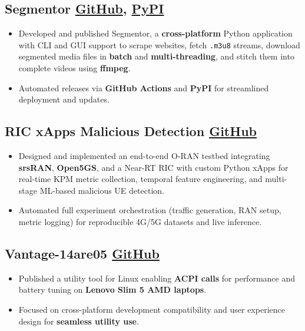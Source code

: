 \documentclass[10pt]{article}
\newcommand{\rside}[1]{
  \hfill {\small\color{accent} #1}%
}
\begin{document}
\subsection{Segmentor \rside{\href{https://github.com/ayushjaipuriyar/animepahe-dl}{GitHub}, \href{https://pypi.org/project/animepahe-dl/}{PyPI}}}
\begin{itemize}
  \item Developed and published {Segmentor}, a \textbf{cross-platform} Python application with CLI and GUI support to scrape websites, fetch \texttt{.m3u8} streams, download segmented media files in \textbf{batch} and \textbf{multi-threading}, and stitch them into complete videos using \textbf{ffmpeg}.
  \item Automated releases via \textbf{GitHub Actions} and \textbf{PyPI} for streamlined deployment and updates.
\end{itemize}
\subsection{RIC xApps Malicious Detection \rside{\href{https://github.com/ayushjaipuriyar/ric-xapps-malicious-detection/}{GitHub}}}
\begin{itemize}
  \item Designed and implemented an end-to-end O-RAN testbed integrating \textbf{srsRAN}, \textbf{Open5GS}, and a Near-RT RIC with custom Python xApps for real-time KPM metric collection, temporal feature engineering, and multi-stage ML-based malicious UE detection.
  \item Automated full experiment orchestration (traffic generation, RAN setup, metric logging) for reproducible 4G/5G datasets and live inference.
\end{itemize}

\subsection{Vantage-14are05 \rside{\href{https://github.com/ayushjaipuriyar/vantage-14are05}{GitHub}}}
\begin{itemize}
  \item Published a utility tool for Linux enabling \textbf{ACPI calls} for performance and battery tuning on \textbf{Lenovo Slim 5 AMD laptops}.
  \item Focused on cross-platform development compatibility and user experience design for \textbf{seamless utility use}.
\end{itemize}
\end{document}
